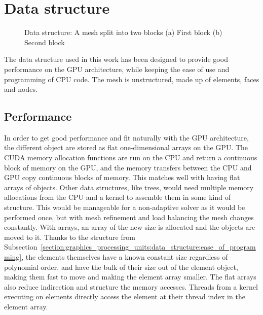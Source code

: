 \section{Data structure} \label{section:graphics_processing_units:data_structure}

\begin{figure}[H]
	\centering
	\hfill
	\caption{Data structure: A mesh split into two blocks (a) First block (b) Second block}
	\label{fig:mesh_structure}
\end{figure}

The data structure used in this work has been designed to provide good performance on the GPU
architecture, while keeping the ease of use and programming of CPU code. The mesh is unstructured,
made up of elements, faces and nodes.

\subsection{Performance} \label{section:graphics_processing_units:data_structure:performance}

In order to get good performance and fit naturally with the GPU architecture, the different object
are stored as flat one-dimensional arrays on the GPU. The CUDA memory allocation functions are run
on the CPU and return a continuous block of memory on the GPU, and the memory transfers between the
CPU and GPU copy continuous blocks of memory. This matches well with having flat arrays of objects.
Other data structures, like trees, would need multiple memory allocations from the CPU and a kernel
to assemble them in some kind of structure. This would be manageable for a non-adaptive solver as it
would be performed once, but with mesh refinement and load balancing the mesh changes constantly.
With arrays, an array of the new size is allocated and the objects are moved to it. Thanks to the
structure from
Subsection~\ref{section:graphics_processing_units:data_structure:ease_of_programming}, the elements
themselves have a known constant size regardless of polynomial order, and have the bulk of their
size out of the element object, making them fast to move and making the element array smaller. The
flat arrays also reduce indirection and structure the memory accesses. Threads from a kernel
executing on elements directly access the element at their thread index in the element array.

